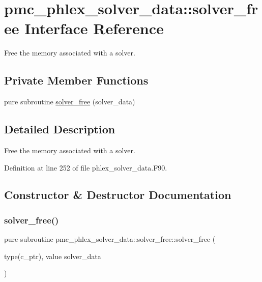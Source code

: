 \hypertarget{interfacepmc__phlex__solver__data_1_1solver__free}{}\section{pmc\+\_\+phlex\+\_\+solver\+\_\+data\+:\+:solver\+\_\+free Interface Reference}
\label{interfacepmc__phlex__solver__data_1_1solver__free}


Free the memory associated with a solver.  


\subsection*{Private Member Functions}
\begin{DoxyCompactItemize}
\item 
pure subroutine \mbox{\hyperlink{interfacepmc__phlex__solver__data_1_1solver__free_a75f708cd70fb392ab1d60d419fab05b8}{solver\+\_\+free}} (solver\+\_\+data)
\end{DoxyCompactItemize}


\subsection{Detailed Description}
Free the memory associated with a solver. 

Definition at line 252 of file phlex\+\_\+solver\+\_\+data.\+F90.



\subsection{Constructor \& Destructor Documentation}
\mbox{\label{interfacepmc__phlex__solver__data_1_1solver__free_a75f708cd70fb392ab1d60d419fab05b8}} 
\subsubsection{\texorpdfstring{solver\+\_\+free()}{solver\_free()}}
{\footnotesize\ttfamily pure subroutine pmc\+\_\+phlex\+\_\+solver\+\_\+data\+::solver\+\_\+free\+::solver\+\_\+free (\begin{DoxyParamCaption}\item[{type(c\+\_\+ptr), value}]{solver\+\_\+data }\end{DoxyParamCaption})\hspace{0.3cm}{\ttfamily [private]}}


